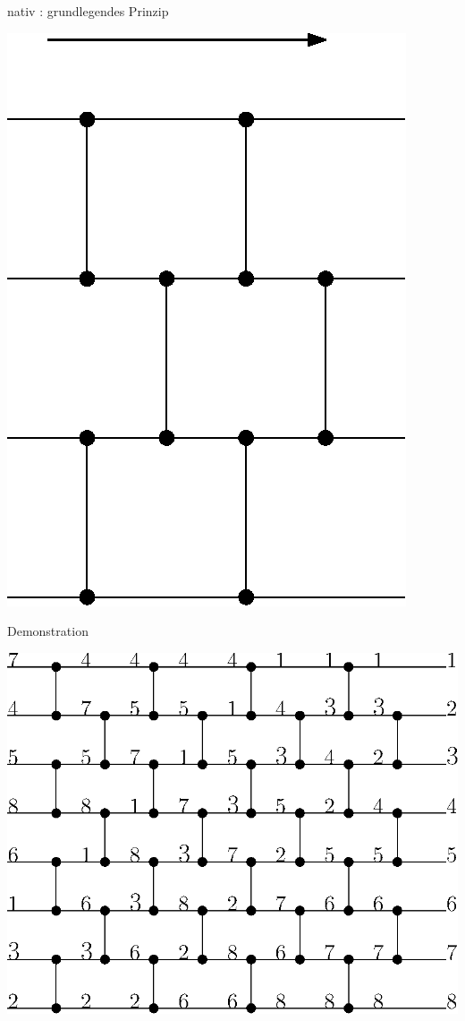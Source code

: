 \documentclass[ucs,9pt]{beamer}
\begin{document}
\begin{frame}{nativ : grundlegendes Prinzip}
\begin{center}
    \includegraphics[scale=0.8]{bild2Komparatornetzwerk.eps}
\end{center}
\end{frame}

\begin{frame}{Demonstration}
\begin{center}
   \includegraphics[scale=0.8]{bild2beispiel.eps}
  \end{center}
\end{frame}
\end{document}
